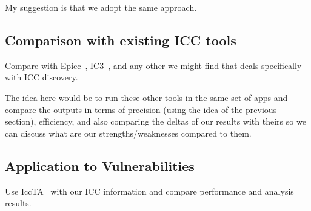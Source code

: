 My suggestion is that we adopt the same approach. 

\subsection{Comparison with existing ICC tools}

Compare with Epicc~\cite{epicc}, IC3~\cite{ic3-icse15}, and any other we might find that deals specifically with ICC discovery. 

The idea here would be to run these other tools in the same set of
apps and compare the outputs in terms of precision (using the idea of
the previous section), efficiency, and also comparing the deltas of
our results with theirs so we can discuss what are our
strengths/weaknesses compared to them.


\subsection{Application to Vulnerabilities}

Use IccTA~\cite{iccta} with our ICC information and compare performance and analysis results. 
